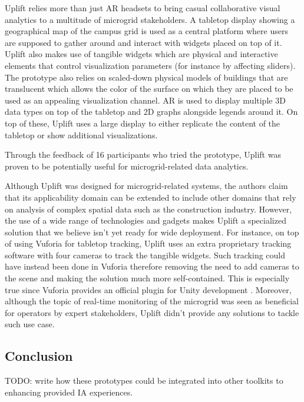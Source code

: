 \documentclass{vgtc}                          %
\begin{document}
\noindent Uplift relies more than just AR headsets to bring casual collaborative visual
analytics to a multitude of microgrid stakeholders. A tabletop display showing
a geographical map of the campus grid is used as a central platform where users
are supposed to gather around and interact with widgets placed on top of it.
Uplift also makes use of tangible
widgets which are physical and interactive elements that control visualization
parameters (for instance by affecting sliders). The prototype also relies on
scaled-down physical models of buildings that are translucent which allows
the color of the surface on which they are placed to be used as an appealing
visualization channel. AR is used to display multiple 3D data types on top of
the tabletop and 2D graphs alongside legends around it. On top of these, Uplift
uses a large display to either replicate the content of the tabletop or show
additional visualizations.

\smallskip

\noindent Through the feedback of 16 participants who tried the prototype, Uplift was
proven to be potentially useful for microgrid-related data analytics.

\smallskip

\noindent Although Uplift was designed for microgrid-related systems,
the authors claim that its applicability domain can be extended to include
other domains that rely on analysis of complex spatial data such as
the construction industry. However, the use of a wide range of technologies
and gadgets makes Uplift a specialized solution that we believe isn't yet
ready for wide deployment. For instance, on top of using Vuforia for tabletop
tracking, Uplift uses an extra proprietary tracking software with four cameras
to track the tangible widgets. Such tracking could have instead been done in
Vuforia therefore removing the need to add cameras to the scene and making the
solution much more self-contained. This is especially true since Vuforia provides
an official plugin for Unity development \cite{unity:vuforia_plugin}.
Moreover, although the topic of real-time monitoring of the microgrid was seen
as beneficial for operators by expert stakeholders, Uplift didn't provide any
solutions to tackle such use case.

\subsection{Conclusion}
TODO: write how these prototypes could be integrated into other toolkits
to enhancing provided IA experiences.
\end{document}
